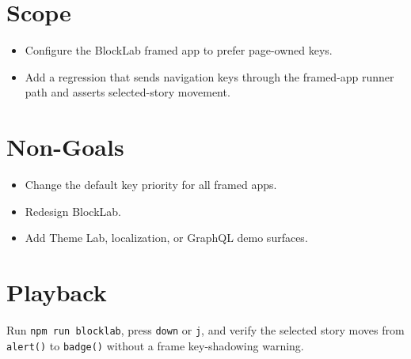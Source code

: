 \section{Scope}\label{record-116-scope}

\begin{itemize}
\tightlist
\item
  Configure the BlockLab framed app to prefer page-owned keys.
\item
  Add a regression that sends navigation keys through the framed-app runner path and asserts selected-story movement.
\end{itemize}

\section{Non-Goals}\label{record-116-non-goals}

\begin{itemize}
\tightlist
\item
  Change the default key priority for all framed apps.
\item
  Redesign BlockLab.
\item
  Add Theme Lab, localization, or GraphQL demo surfaces.
\end{itemize}

\section{Playback}\label{record-116-playback}

Run \texttt{n\allowbreak{}p\allowbreak{}m\allowbreak{} \allowbreak{}r\allowbreak{}u\allowbreak{}n\allowbreak{} \allowbreak{}b\allowbreak{}l\allowbreak{}o\allowbreak{}c\allowbreak{}k\allowbreak{}l\allowbreak{}a\allowbreak{}b}, press \texttt{d\allowbreak{}o\allowbreak{}w\allowbreak{}n} or \texttt{j}, and verify the selected story moves from \texttt{a\allowbreak{}l\allowbreak{}e\allowbreak{}r\allowbreak{}t\allowbreak{}(\allowbreak{})} to \texttt{b\allowbreak{}a\allowbreak{}d\allowbreak{}g\allowbreak{}e\allowbreak{}(\allowbreak{})} without a frame key-shadowing warning.


